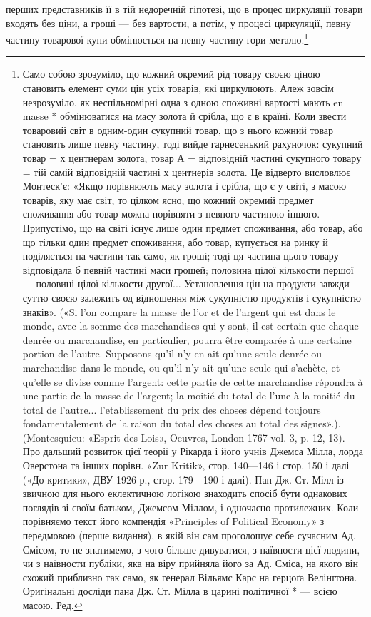 \parcont{}  %
перших представників її в тій недоречній гіпотезі, що в процес
циркуляції товари входять без ціни, а гроші — без вартости, а
потім, у процесі циркуляції, певну частину товарової купи обмінюється
на певну частину гори металю.\footnote{
Само собою зрозуміло, що кожний окремий рід товару своєю ціною
становить елемент суми цін усіх товарів, які циркулюють. Алеж зовсім
незрозуміло, як неспільномірні одна з одною споживні вартості мають
en masse * обмінюватися на масу золота й срібла, що є в країні. Коли
звести товаровий світ в одним-один сукупний товар, що з нього кожний
товар становить лише певну частину, тоді вийде гарнесенький рахуночок:
сукупний товар = х центнерам золота, товар А = відповідній частині
сукупного товару = тій самій відповідній частині х центнерів золота. Це
відверто висловлює Монтеск’є: «Якщо порівнюють масу золота і срібла,
що є у світі, з масою товарів, яку має світ, то цілком ясно, що кожний
окремий предмет споживання або товар можна порівняти з певного частиною
іншого. Припустімо, що на світі існує лише один предмет споживання,
або товар, або що тільки один предмет споживання, або товар, купується
на ринку й поділяється на частини так само, як гроші; тоді ця частина
цього товару відповідала б певній частині маси грошей; половина цілої
кількости першої — половині цілої кількости другої... Установлення цін
на продукти завжди суттю своєю залежить од відношення між сукупністю
продуктів і сукупністю знаків». («Si l’on compare la masse de l’or et
de l’argent qui est dans le monde, avec la somme des marchandises qui y
sont, il est certain que chaque denrée ou marchandise, en particulier, pourra
être comparée à une certaine portion de l’autre. Supposons qu’il n’y en ait
qu’une seule denrée ou marchandise dans le monde, ou qu’il n’y ait qu’une
seule qui s’achète, et qu’elle se divise comme l’argent: cette partie de cette marchandise
répondra à une partie de la masse de l’argent; la moitié du total
de l’une à la moitié du total de l’autre... l’etablissement du prix des choses
dépend toujours fondamentalement de la raison du total des choses au
total des signes».). (Montesquieu: «Esprit des Lois», Oeuvres, London
1767 vol. 3, p. 12, 13). Про дальший розвиток цієї теорії у Рікарда
і його учнів Джемса Мілла, лорда Оверстона та інших порівн. «Zur
Kritik», стор. 140—146 і стор. 150 і далі («До критики», ДВУ 1926 р.,
стор. 179—190 і далі). Пан Дж. Ст. Мілл із звичною для нього еклектичною
логікою знаходить спосіб бути однакових поглядів зі своїм
батьком, Джемсом Міллом, і одночасно протилежних. Коли порівняємо
текст його компендія «Principles of Political Economy» з передмовою
(перше видання), в якій він сам проголошує себе сучасним Ад. Смісом,
то не знатимемо, з чого більше дивуватися, з наївности цієї людини, чи
з наївности публіки, яка на віру прийняла його за Ад. Сміса, на якого
він схожий приблизно так само, як генерал Вільямс Карс на герцоґа
Велінґтона. Оригінальні досліди пана Дж. Ст. Мілла в царині політичної
* — всією масою. Ред.
}

